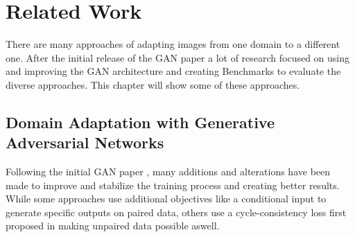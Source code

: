 \chapter{Related Work}
\label{sec:related_work}

There are many approaches of adapting images from one domain to a different one. After the initial release of the GAN paper \cite{NIPS2014_5423} a lot of research focused on using and improving the GAN architecture and creating Benchmarks to evaluate the diverse approaches. This chapter will show some of these approaches.

\section{Domain Adaptation with Generative Adversarial Networks}
Following the initial GAN paper \cite{NIPS2014_5423}, many additions and alterations have been made to improve and stabilize the training process and creating better results. While some approaches use additional objectives like a conditional input to generate specific outputs \cite{DBLP:journals/corr/IsolaZZE16} on paired data, others use a cycle-consistency loss first proposed in \cite{DBLP:journals/corr/ZhuPIE17} making unpaired data possible aswell. 